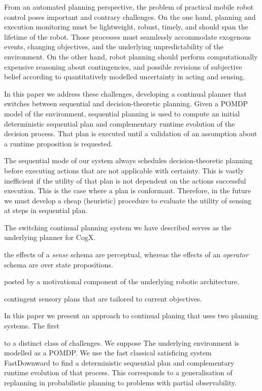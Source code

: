 

From an automated planning perspective, the problem of practical
mobile robot control poses important and contrary challenges.
On the one hand, planning and execution monitoring must be
lightweight, robust, timely, and should span the lifetime of the
robot. Those processes must seamlessly accommodate exogenous events,
changing objectives, and the underlying unpredictability of the
environment.
On the other hand, robot planning should perform computationally
expensive reasoning about contingencies, and possible revisions of
subjective belief according to quantitatively modelled uncertainty in
acting and sensing. 

In this paper we address these challenges, developing a continual
planner that switches between sequential and decision-theoretic
planning. Given a POMDP model of the environment, sequential planning
is used to compute an initial deterministic sequential plan and
complementary runtime evolution of the decision process. That plan is
executed until a validation of an assumption about a runtime
proposition is requested.


The sequential mode of our system always schedules decision-theoretic
planning before executing actions that are not applicable with
certainty. This is vastly inefficient if the utility of that plan is
not dependent on the actions successful execution. This is the case
where a plan is conformant. Therefore, in the future we must develop a
cheap (heuristic) procedure to evaluate the utility of sensing at
steps in sequential plan.






The switching continual planning system we have described serves as
the underlying planner for CogX.




the effects of a {\em sense} schema are perceptual, whereas the
effects of an {\em operator} schema are over state propositions.




posted by a motivational component of the underlying robotic
architecture. 

contingent sensory plans that are tailored to current
objectives.

In this paper we present an approach to continual planing that uses
two planning systems. The first 

 to a distinct class of
challenges. We suppose 
The underlying environment is modelled as a POMDP. We use the fast
classical satisficing system FastDownward to find a deterministic
sequential plan and complementary runtime evolution of that
process. This corresponds to a generalisation of replanning in
probabilistic planning to problems with partial observability.

